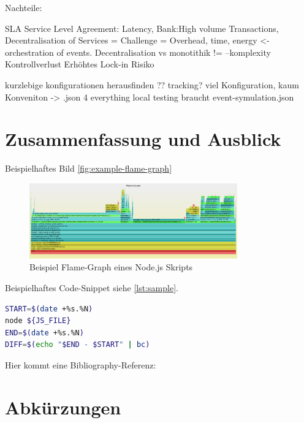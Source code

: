 \documentclass[
12pt,
english,
ngerman,
headsepline,
twoside,
openright,
numbers=noenddot,version=first
]{scrreprt}
\begin{document}
Nachteile:

SLA Service Level Agreement: Latency, Bank:High volume Transactions, 
Decentralisation of Services = Challenge = Overhead, time, energy <- orchestration of events.
Decentralisation vs monotithik != --komplexity
Kontrollverlust
Erhöhtes Lock-in Risiko

kurzlebige konfigurationen herausfinden ?? tracking?
viel Konfiguration, kaum Konveniton -> .json 4 everything
local testing braucht event-symulation.json

\chapter{Zusammenfassung und Ausblick}


Beispielhaftes Bild \autoref{fig:example-flame-graph}

\begin{figure}[h]
	\centering
	\includegraphics[width=0.8\textwidth]{pics/example-flame-graph.eps}
	\caption{Beispiel Flame-Graph eines Node.js Skripts}
	\label{fig:example-flame-graph}
\end{figure}

Beispielhaftes Code-Snippet siehe \autoref{lst:sample}.

\begin{lstlisting}[language=bash,caption={Aufnahme der \glqq real\grqq-Zeit},label={lst:sample}]
START=$(date +%s.%N)
node ${JS_FILE}
END=$(date +%s.%N)
DIFF=$(echo "$END - $START" | bc)
\end{lstlisting}

Hier kommt eine Bibliography-Referenz: \cite{booch2007object}

\lstlistoflistings

\listoffigures

\listoftables

\chapter*{Abkürzungen}

\end{document}

